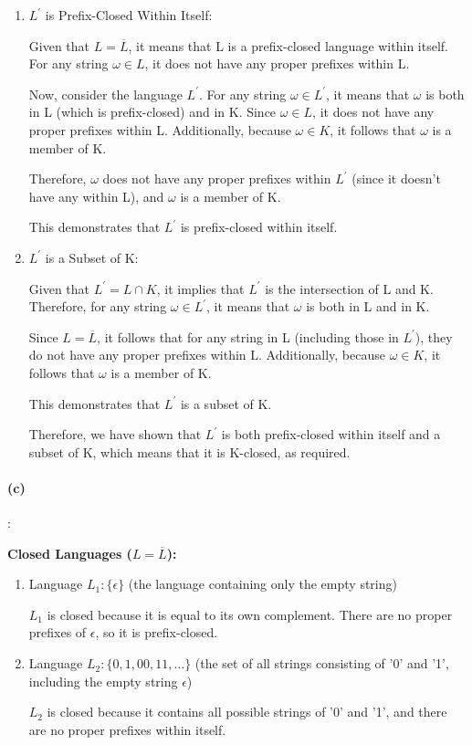 \documentclass{article}
\begin{document}
\begin{enumerate}
  \item $L^\prime$ is Prefix-Closed Within Itself:
  
  Given that $L = \overline{L}$, it means that L is a prefix-closed language within itself. For any string $\omega \in L$, it does not have any proper prefixes within L.

  Now, consider the language $L^\prime$. For any string $\omega \in L^\prime$, it means that $\omega$ is both in L (which is prefix-closed) and in K. Since $\omega  \in L$, it does not have any proper prefixes within L. Additionally, because $\omega \in K$, it follows that $\omega$ is a member of K.
  
  Therefore, $\omega$ does not have any proper prefixes within $L^\prime$ (since it doesn't have any within L), and $\omega$ is a member of K.
  
  This demonstrates that $L^\prime$ is prefix-closed within itself.

  \item $L^\prime$ is a Subset of K:
  
  Given that $L^\prime = L \cap K$, it implies that $L^\prime$ is the intersection of L and K. Therefore, for any string $\omega \in L^\prime$, it means that $\omega$ is both in L and in K.

  Since $L = \overline{L}$, it follows that for any string in L (including those in $L^\prime$), they do not have any proper prefixes within L. Additionally, because $\omega \in K$, it follows that $\omega$ is a member of K.

  This demonstrates that $L^\prime$ is a subset of K.

  Therefore, we have shown that $L^\prime$ is both prefix-closed within itself and a subset of K, which means that it is K-closed, as required.

\end{enumerate}

\paragraph{(c)}:

\textbf{Closed Languages ($L = \overline{L}$):}

\begin{enumerate}
  \item Language $L_1: \{\epsilon\}$ (the language containing only the empty string)
  
  $L_1$ is closed because it is equal to its own complement. There are no proper prefixes of $\epsilon$, so it is prefix-closed.
  
  \item Language $L_2: \{0, 1, 00, 11, \ldots\}$ (the set of all strings consisting of '0' and '1', including the empty string $\epsilon$)
  
  $L_2$ is closed because it contains all possible strings of '0' and '1', and there are no proper prefixes within itself.
\end{enumerate}
\end{document}
